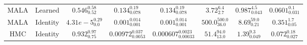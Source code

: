 \begin{tabular}{cccccccc}
  MALA                       & Learned                      & $0.546^{0.58}_{0.52}$    & $0.134^{0.19}_{0.078}$              & $\mathbf{0.134^{0.19}_{0.078}}$          & $3.72^{6.4}_{2.7}$                         & $0.987^{4.5}_{0.043}$                             & $0.0601^{0.1}_{0.031}$                                       \\
  MALA                       & Identity                     & $4.31e-5^{0.29}_{0.0}$   & $0.001^{0.014}_{0.001}$             & $0.001^{0.014}_{0.001}$                  & $500.0^{500.0}_{36.0}$                     & $8.69^{59.0}_{0.21}$                              & $0.351^{1.7}_{0.05}$                                         \\
  HMC                        & Identity                     & $0.932^{0.97}_{0.75}$    & $0.00972^{0.037}_{0.0053}$          & $0.000607^{0.0023}_{0.00033}$            & $51.4^{94.0}_{13.0}$                       & $1.39^{9.3}_{0.049}$                              & $0.072^{0.18}_{0.027}$                                       \\
  \bottomrule
\end{tabular}
